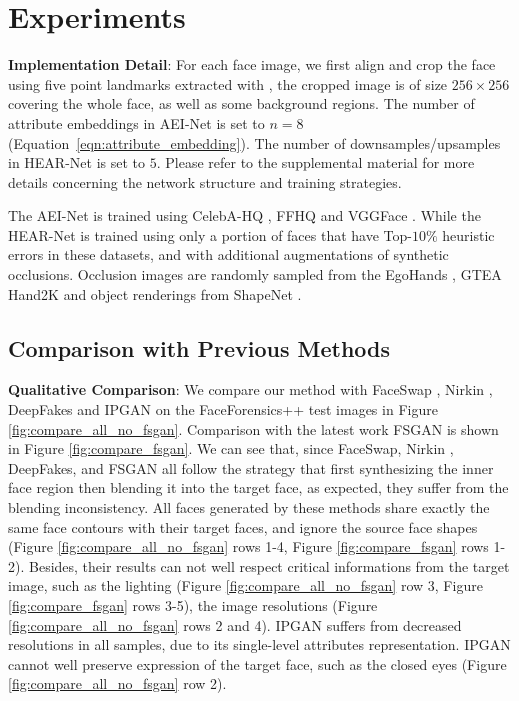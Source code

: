 \section{Experiments}

\noindent\textbf{Implementation Detail}: 
For each face image, we first align and crop the face using five point landmarks extracted with \cite{chen2014joint}, the cropped image is of size $256\times 256$ covering the whole face, as well as some background regions. The number of attribute embeddings in AEI-Net is set to $n=8$ (Equation~\ref{eqn:attribute_embedding}). The number of downsamples/upsamples in HEAR-Net is set to $5$. Please refer to the supplemental material for more details concerning the network structure and training strategies.

The AEI-Net is trained using CelebA-HQ \cite{karras2017progressive}, FFHQ \cite{karras2019style} and VGGFace \cite{parkhi2015deep}. 
While the HEAR-Net is trained using only a portion of faces that have Top-$10\%$ heuristic errors in these datasets, 
and with additional augmentations of synthetic occlusions. 
Occlusion images are randomly sampled from the EgoHands \cite{bambach2015lending}, GTEA Hand2K \cite{fathi2011learning,li2015delving,li2013learning} and object renderings from ShapeNet \cite{chang2015shapenet}. 

\subsection{Comparison with Previous Methods}
\noindent\textbf{Qualitative Comparison}:
We compare our method with FaceSwap \cite{faceswap}, Nirkin \etal \cite{nirkin2018face}, DeepFakes \cite{deepfake} and IPGAN \cite{Bao_ipgan} on the FaceForensics++ \cite{rossler2019faceforensics++} test images in Figure \ref{fig:compare_all_no_fsgan}. 
Comparison with the latest work FSGAN \cite{nirkin2019fsgan} is shown in Figure \ref{fig:compare_fsgan}.
We can see that, since FaceSwap, Nirkin \etal, DeepFakes, and FSGAN all follow the strategy that first synthesizing the inner face region then blending it into the target face, as expected, they suffer from the blending inconsistency. 
All faces generated by these methods share exactly the same face contours with their target faces, and ignore the source face shapes (Figure \ref{fig:compare_all_no_fsgan} rows 1-4, Figure \ref{fig:compare_fsgan} rows 1-2). Besides, their results can not well respect critical informations from the target image, such as the lighting (Figure \ref{fig:compare_all_no_fsgan} row 3, Figure \ref{fig:compare_fsgan} rows 3-5), the image resolutions (Figure \ref{fig:compare_all_no_fsgan} rows 2 and 4). IPGAN \cite{Bao_ipgan} suffers from decreased resolutions in all samples, due to its single-level attributes representation. IPGAN cannot well preserve expression of the target face, such as the closed eyes (Figure \ref{fig:compare_all_no_fsgan} row 2).


